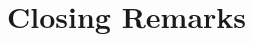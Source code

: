 \documentclass{birkjour}
\theoremstyle{definition}
\theoremstyle{remark}
\numberwithin{equation}{section}
\begin{document}
\section{Closing Remarks}





\end{document}
